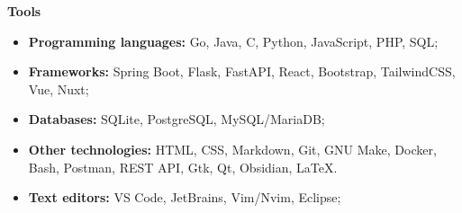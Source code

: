 {\vspace{0.5cm} \hspace{-0.5cm} \Large \textbf{Tools}}

\begin{itemize}
    \item \textbf{Programming languages:} Go, Java, C, Python, JavaScript, PHP, SQL;
    \item \textbf{Frameworks:} Spring Boot, Flask, FastAPI, React, Bootstrap, TailwindCSS, Vue, Nuxt;
    \item \textbf{Databases:} SQLite, PostgreSQL, MySQL/MariaDB;
    \item \textbf{Other technologies:} HTML, CSS, Markdown, Git, GNU Make, Docker, Bash, Postman, 
        REST API, Gtk, Qt, Obsidian, LaTeX.
    \item \textbf{Text editors:} VS Code, JetBrains, Vim/Nvim, Eclipse;
\end{itemize}